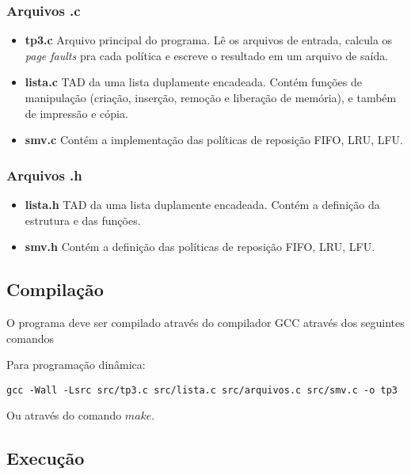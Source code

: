 \documentclass[12pt]{article}
\begin{document}
\subsubsection{Arquivos .c}

\begin{itemize}
\item \textbf{tp3.c} Arquivo principal do programa. Lê os arquivos de entrada, calcula os \textit{page faults} pra cada política e escreve o resultado em um arquivo de saída.
\item \textbf{lista.c} TAD da uma lista duplamente encadeada. Contém funções de manipulação (criação, inserção, remoção e liberação de memória), e também de impressão e cópia.
\item \textbf{smv.c} Contém a implementação das políticas de reposição FIFO, LRU, LFU.
\end{itemize}

\subsubsection{Arquivos .h}

\begin{itemize}
\item \textbf{lista.h} TAD da uma lista duplamente encadeada. Contém a definição da estrutura e das funções.
\item \textbf{smv.h} Contém a definição das políticas de reposição FIFO, LRU, LFU.
\end{itemize}

\subsection{Compilação}

O programa deve ser compilado através do compilador GCC através dos seguintes comandos

Para programação dinâmica:
\begin{footnotesize}
\begin{verbatim}
gcc -Wall -Lsrc src/tp3.c src/lista.c src/arquivos.c src/smv.c -o tp3 \end{verbatim}
\end{footnotesize}

Ou através do comando $make$.

\subsection{Execução}
\end{document}
